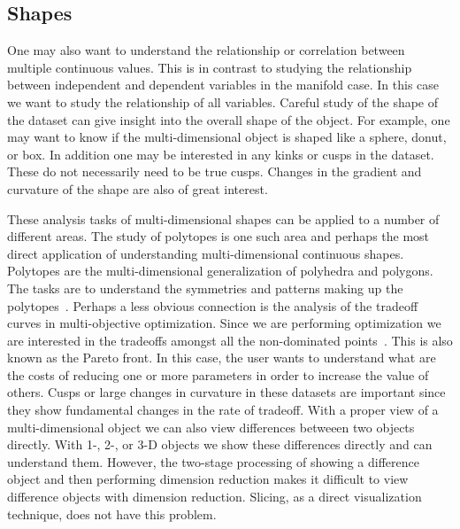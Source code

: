 \subsection{Shapes}
\label{sec:shapes}

One may also want to understand the relationship or correlation between
multiple continuous values. This is in contrast to studying the relationship
between independent and dependent variables in the manifold case. In this case
we want to study the relationship of all variables. Careful study of the shape
of the dataset can give insight into the overall shape of the object. For
example, one may want to know if the multi-dimensional object is shaped like a
sphere, donut, or box.
In addition one may be interested in any kinks or cusps in the dataset.
 These do not necessarily need to be true cusps. Changes in
the gradient and curvature of the shape are also of great interest.

These analysis tasks of multi-dimensional shapes can be applied to a number of
different areas. The study of polytopes is one such area and perhaps the most
direct application of understanding multi-dimensional continuous shapes.
Polytopes are the multi-dimensional generalization of polyhedra and polygons.
The tasks are to understand the symmetries and patterns making up the
polytopes~\cite{Ziegler:2012}. Perhaps a less obvious connection is the
analysis of the tradeoff curves in multi-objective optimization. Since we are
performing optimization we are interested in the tradeoffs amongst all the
non-dominated points~\cite{nondominated}. This is also known as the Pareto
front. In this case, the user wants to understand what are the costs of
reducing one or more parameters in order to increase the value of others. Cusps
or large changes in curvature in these datasets are important since they show
fundamental changes in the rate of tradeoff.  With a proper view of a
multi-dimensional object we can also view differences betweeen two objects
directly. With 1-, 2-, or 3-D objects we show these differences directly and
can understand them.  
However, the two-stage processing of showing a difference object and then
performing dimension reduction makes it difficult to view difference objects
with dimension reduction. Slicing, as a direct visualization technique, does
not have this problem.


